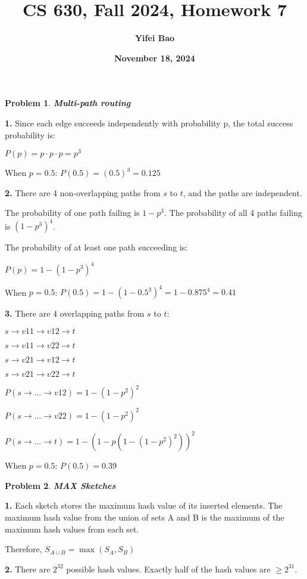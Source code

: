 \documentclass[11pt]{exam}
\title{\Large{\textbf{CS 630, Fall 2024, Homework 7}}}
\author{\textbf{Yifei Bao}}
\date{\textbf{November 18, 2024}}
\newtheorem{problem}{Problem}
\begin{document}
\maketitle

\begin{problem}
    \textbf{Multi-path routing} 
\end{problem} 

\noindent\textbf{1.}
Since each edge succeeds independently with probability p, the total success probability is:

$P(p) = p \cdot p \cdot p = p^3$

When $p = 0.5$: $P(0.5) = (0.5)^3 = 0.125$

\noindent\textbf{2.}
There are 4 non-overlapping paths from $s$ to $t$, and the paths are independent.

The probability of one path failing is $1 - p^3$.
The probability of all 4 paths failing is $(1 - p^3)^4$.

The probability of at least one path succeeding is:

$P(p) = 1 - (1 - p^3)^4$

When $p = 0.5$: $P(0.5) = 1 - (1 - 0.5^3)^4 = 1 - 0.875^4 = 0.41$

\noindent\textbf{3.}
There are 4 overlapping paths from $s$ to $t$:

$s \to v11 \to v12 \to t$

$s \to v11 \to v22 \to t$   

$s \to v21 \to v12 \to t$

$s \to v21 \to v22 \to t$

$P(s \to ... \to v12) = 1 - (1-p^2)^2$

$P(s \to ... \to v22) = 1 - (1-p^2)^2$

$P(s \to ... \to t) = 1 - (1 - p(1 - (1-p^2)^2))^2$

When $p = 0.5$: $P(0.5) = 0.39$


\begin{problem}
    \textbf{MAX Sketches}
\end{problem}

\noindent\textbf{1.}
Each sketch stores the maximum hash value of its inserted elements. The maximum hash value from the union of sets  A  and  B  is the maximum of the maximum hash values from each set.

Therefore, $S_{A \cup B} = \max(S_A, S_B)$

\noindent\textbf{2.}
There are $2^{32}$ possible hash values. Exactly half of the hash values are  $\geq 2^{31}$.
\end{document}
